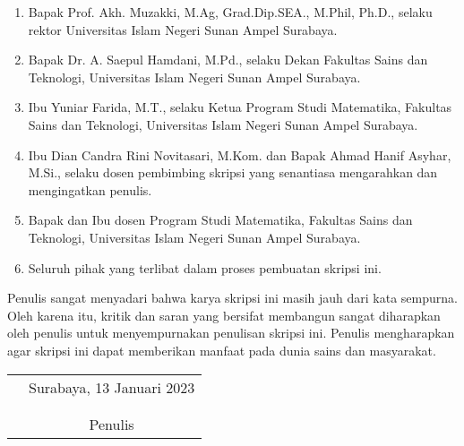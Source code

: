 \documentclass[]{mathuinsa}
\begin{document}
    \begin{enumerate}
        \item Bapak Prof. Akh. Muzakki, M.Ag, Grad.Dip.SEA., M.Phil, Ph.D., selaku rektor Universitas Islam Negeri Sunan Ampel Surabaya.
        \item Bapak Dr. A. Saepul Hamdani, M.Pd., selaku Dekan Fakultas Sains dan Teknologi, Universitas Islam Negeri Sunan Ampel Surabaya.
        \item Ibu Yuniar Farida, M.T., selaku Ketua Program Studi Matematika, Fakultas Sains dan Teknologi, Universitas Islam Negeri Sunan Ampel Surabaya.
        \item Ibu Dian Candra Rini Novitasari, M.Kom. dan Bapak Ahmad Hanif Asyhar, M.Si., selaku dosen pembimbing skripsi yang senantiasa mengarahkan dan mengingatkan penulis.
        \item Bapak dan Ibu dosen Program Studi Matematika, Fakultas Sains dan Teknologi, Universitas Islam Negeri Sunan Ampel Surabaya.
        \item Seluruh pihak yang terlibat dalam proses pembuatan skripsi ini.
    \end{enumerate}

    Penulis sangat menyadari bahwa karya skripsi ini masih jauh dari kata sempurna. Oleh karena itu, kritik dan saran yang bersifat membangun sangat diharapkan oleh penulis untuk menyempurnakan penulisan skripsi ini. Penulis mengharapkan agar skripsi ini dapat memberikan manfaat pada dunia sains dan masyarakat.
    \vspace{0.8cm}

    \begin{tabular}{p{7cm}c}
        &Surabaya, 13 Januari 2023\\
        &\\
        &\\
        &Penulis
    \end{tabular}


    \newpage{}
    \makeatletter\renewcommand{}\makeatother
    \begin{onehalfspacing}\tableofcontents\end{onehalfspacing}
\end{document}
